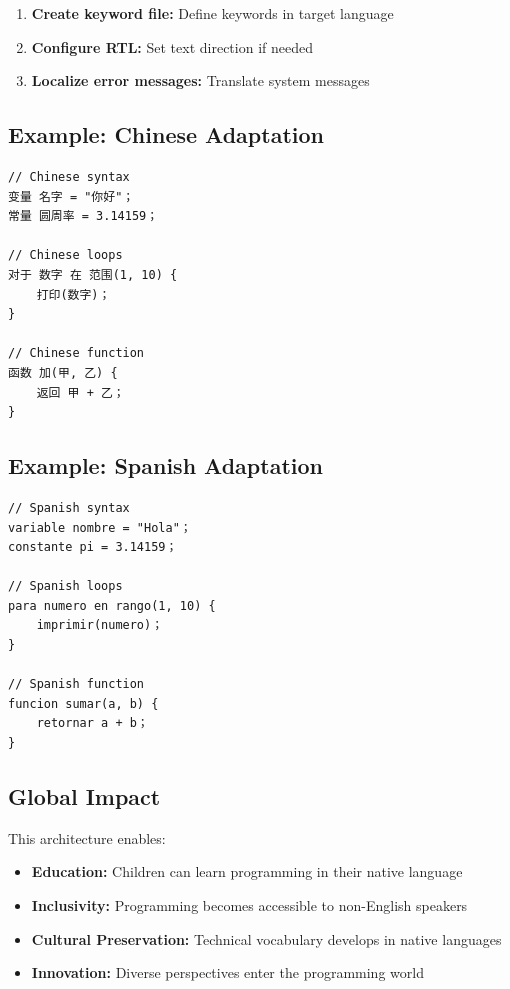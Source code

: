 \documentclass[11pt,a4paper]{article}
\begin{document}
\begin{enumerate}
    \item \textbf{Create keyword file:} Define keywords in target language
    \item \textbf{Configure RTL:} Set text direction if needed
    \item \textbf{Localize error messages:} Translate system messages
\end{enumerate}

\subsection{Example: Chinese Adaptation}

\begin{lstlisting}[language={},title={Chinese Programming with Al-Marjaa}]
// Chinese syntax
变量 名字 = "你好"；
常量 圆周率 = 3.14159；

// Chinese loops
对于 数字 在 范围(1, 10) {
    打印(数字)；
}

// Chinese function
函数 加(甲, 乙) {
    返回 甲 + 乙；
}
\end{lstlisting}

\subsection{Example: Spanish Adaptation}

\begin{lstlisting}[language={},title={Spanish Programming}]
// Spanish syntax
variable nombre = "Hola"；
constante pi = 3.14159；

// Spanish loops
para numero en rango(1, 10) {
    imprimir(numero)；
}

// Spanish function
funcion sumar(a, b) {
    retornar a + b；
}
\end{lstlisting}

\subsection{Global Impact}

This architecture enables:

\begin{itemize}
    \item \textbf{Education:} Children can learn programming in their native language
    \item \textbf{Inclusivity:} Programming becomes accessible to non-English speakers
    \item \textbf{Cultural Preservation:} Technical vocabulary develops in native languages
    \item \textbf{Innovation:} Diverse perspectives enter the programming world
\end{itemize}
\end{document}
